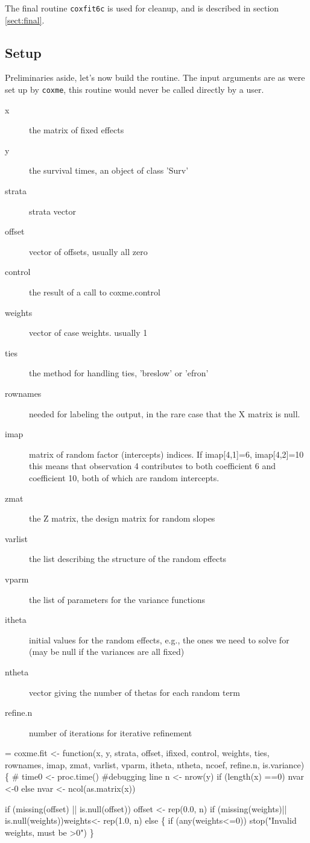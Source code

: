 \documentclass{article}
\begin{document}
The final routine \Verb!coxfit6c! is used for cleanup, and is
described in section \ref{sect:final}.

\subsection{Setup}
Preliminaries aside, let's now build the routine.               %
The input arguments are as were set up by \Verb!coxme!, this
routine would never be called directly by a user.
\begin{description}
  \item[x] the matrix of fixed effects
  \item[y] the survival times, an object of class 'Surv'
  \item[strata] strata vector
  \item[offset] vector of offsets, usually all zero
  \item[control] the result of a call to coxme.control
  \item[weights] vector of case weights. usually 1
  \item[ties] the method for handling ties, 'breslow' or 'efron'
  \item[rownames] needed for labeling the output, in the rare case that
    the X matrix is null.
  \item[imap] matrix of random factor (intercepts) indices.  If imap[4,1]=6,
    imap[4,2]=10 this means that observation 4 contributes to both coefficient
    6 and coefficient 10, both of which are random intercepts.
  \item[zmat] the Z matrix, the design matrix for random slopes
  \item[varlist] the list describing the structure of the random effects
  \item[vparm] the list of parameters for the variance functions
  \item[itheta] initial values for the random effects, e.g., the ones we need
    to solve for  (may be null if the variances are all fixed)
  \item[ntheta] vector giving the number of thetas for each random term
  \item[refine.n] number of iterations for iterative refinement
\end{description}
\begin{nwchunk}
=
 coxme.fit <- function(x, y, strata, offset, ifixed, control,
                         weights, ties, rownames, 
                         imap, zmat, varlist, vparm, itheta,
                         ntheta, ncoef, refine.n, is.variance) \{
     #     time0 <- proc.time() #debugging line
     n <-  nrow(y)
     if (length(x) ==0) nvar <-0
     else nvar <- ncol(as.matrix(x))
     
     if (missing(offset) || is.null(offset)) offset <- rep(0.0, n)
     if (missing(weights)|| is.null(weights))weights<- rep(1.0, n)
     else \{
         if (any(weights<=0)) stop("Invalid weights, must be >0")
         \}
\end{nwchunk}
\end{document}

